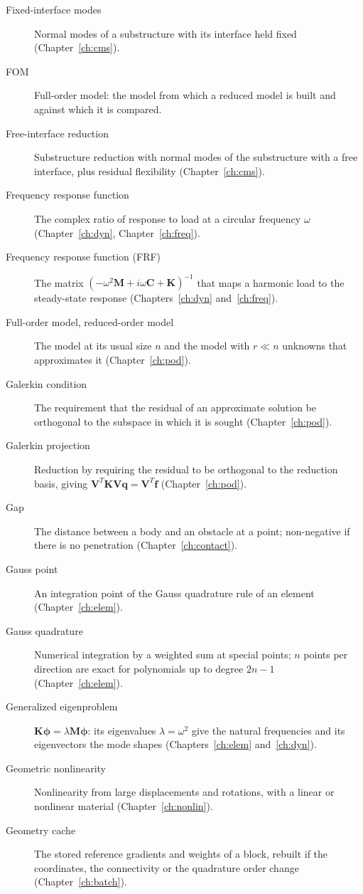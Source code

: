 \begin{description}
\item[Fixed-interface modes] Normal modes of a substructure with its interface held fixed (Chapter~\ref{ch:cms}).
\item[FOM] Full-order model: the model from which a reduced model is built and against which it is compared.
\item[Free-interface reduction] Substructure reduction with normal modes of the substructure with a free interface, plus residual flexibility (Chapter~\ref{ch:cms}).
\item[Frequency response function] The complex ratio of response to load at a circular frequency $\omega$ (Chapter~\ref{ch:dyn}, Chapter~\ref{ch:freq}).
\item[Frequency response function (FRF)] The matrix $(-\omega^2\bm M+i\omega\bm C+\bm K)^{-1}$ that maps a harmonic load to the steady-state response (Chapters~\ref{ch:dyn} and~\ref{ch:freq}).
\item[Full-order model, reduced-order model] The model at its usual size $n$ and the model with $r\ll n$ unknowns that approximates it (Chapter~\ref{ch:pod}).
\item[Galerkin condition] The requirement that the residual of an approximate solution be orthogonal to the subspace in which it is sought (Chapter~\ref{ch:pod}).
\item[Galerkin projection] Reduction by requiring the residual to be orthogonal to the reduction basis, giving $\bm V^T\bm K\bm V\bm q=\bm V^T\bm f$ (Chapter~\ref{ch:pod}).
\item[Gap] The distance between a body and an obstacle at a point; non-negative if there is no penetration (Chapter~\ref{ch:contact}).
\item[Gauss point] An integration point of the Gauss quadrature rule of an element (Chapter~\ref{ch:elem}).
\item[Gauss quadrature] Numerical integration by a weighted sum at special points; $n$ points per direction are exact for polynomials up to degree $2n-1$ (Chapter~\ref{ch:elem}).
\item[Generalized eigenproblem] $\bm K\bm\phi=\lambda\bm M\bm\phi$: its eigenvalues $\lambda=\omega^2$ give the natural frequencies and its eigenvectors the mode shapes (Chapters~\ref{ch:elem} and~\ref{ch:dyn}).
\item[Geometric nonlinearity] Nonlinearity from large displacements and rotations, with a linear or nonlinear material (Chapter~\ref{ch:nonlin}).
\item[Geometry cache] The stored reference gradients and weights of a block, rebuilt if the coordinates, the connectivity or the quadrature order change (Chapter~\ref{ch:batch}).

\end{description}
